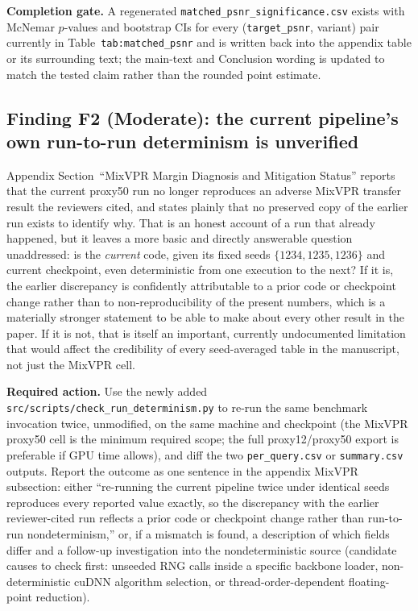 \documentclass[11pt]{article}
\begin{document}
\textbf{Completion gate.} A regenerated \texttt{matched\_psnr\_significance.csv}
exists with McNemar $p$-values and bootstrap CIs for every
(\texttt{target\_psnr}, variant) pair currently in Table~\texttt{tab:matched\_psnr}
and is written back into the appendix table or its surrounding text; the
main-text and Conclusion wording is updated to match the tested claim rather
than the rounded point estimate.

\subsection*{Finding F2 (Moderate): the current pipeline's own run-to-run determinism is unverified}
\label{sec:f2}
Appendix Section~``MixVPR Margin Diagnosis and Mitigation Status'' reports
that the current proxy50 run no longer reproduces an adverse MixVPR transfer
result the reviewers cited, and states plainly that no preserved copy of the
earlier run exists to identify why. That is an honest account of a run that
already happened, but it leaves a more basic and directly answerable question
unaddressed: is the \emph{current} code, given its fixed seeds
$\{1234,1235,1236\}$ and current checkpoint, even deterministic from one
execution to the next? If it is, the earlier discrepancy is confidently
attributable to a prior code or checkpoint change rather than to
non-reproducibility of the present numbers, which is a materially stronger
statement to be able to make about every other result in the paper. If it is
not, that is itself an important, currently undocumented limitation that
would affect the credibility of every seed-averaged table in the manuscript,
not just the MixVPR cell.

\textbf{Required action.} Use the newly added
\texttt{src/scripts/check\_run\_determinism.py} to re-run the same benchmark
invocation twice, unmodified, on the same machine and checkpoint (the MixVPR
proxy50 cell is the minimum required scope; the full proxy12/proxy50 export
is preferable if GPU time allows), and diff the two \texttt{per\_query.csv}
or \texttt{summary.csv} outputs. Report the outcome as one sentence in the
appendix MixVPR subsection: either ``re-running the current pipeline twice
under identical seeds reproduces every reported value exactly, so the
discrepancy with the earlier reviewer-cited run reflects a prior code or
checkpoint change rather than run-to-run nondeterminism,'' or, if a mismatch
is found, a description of which fields differ and a follow-up investigation
into the nondeterministic source (candidate causes to check first: unseeded
RNG calls inside a specific backbone loader, non-deterministic cuDNN
algorithm selection, or thread-order-dependent floating-point reduction).
\end{document}
